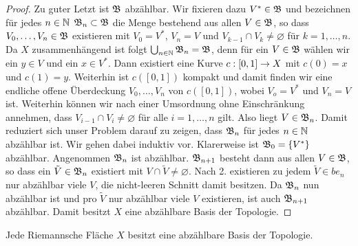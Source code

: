 \begin{proof}
  Zu guter Letzt ist $\mathfrak{B}$ abzählbar. 
  Wir fixieren dazu $V^\ast \in \mathfrak{B}$ und bezeichnen für jedes $n \in \mathbb{N}$
  $\mathfrak{B}_n \subset \mathfrak{B}$ die Menge bestehend aus allen $V \in \mathfrak{B}$, so
  dass $V_0, \dots, V_n \in \mathfrak{B}$ existieren mit $V_0 = V^\ast$, $V_n = V$ und $V_{k-1}
  \cap V_k \neq \varnothing$ für $k = 1, \dots, n$. 
  Da $X$ zusammenhängend ist folgt $\bigcup_{n \in \mathbb{N}} \mathfrak{B}_n =
  \mathfrak{B}$, denn für ein $V \in \mathfrak{B}$ wählen wir ein $y \in V$ und ein $x
  \in V^\ast$. Dann existiert eine Kurve $c: [0,1] \rightarrow X$ mit $c(0)
  = x$ und $c(1) = y$. Weiterhin ist $c([0,1])$ kompakt und damit
  finden wir eine endliche offene Überdeckung $V_0, \dots, V_n$ von
  $c([0,1])$, wobei $V_o = V^\ast$ und $V_n = V$ ist. Weiterhin
  können wir nach einer Umsordnung ohne Einschränkung annehmen,
  dass $V_{i-1} \cap V_{i} \neq \varnothing$ für alle $i= 1, \dots,
  n$ gilt. Also liegt $V \in \mathfrak{B}_n$.
  Damit reduziert sich unser Problem darauf zu zeigen, dass $\mathfrak{B}_n$
  für jedes $n \in \mathbb{N}$ abzählbar ist. Wir gehen dabei induktiv vor.
  Klarerweise ist $\mathfrak{B}_0 = \{V^\ast\}$ abzählbar. Angenommen $\mathfrak{B}_n$
  ist abzählbar. $\mathfrak{B}_{n+1}$ besteht dann aus allen $V \in \mathfrak{B}$, so
  dass ein $\tilde V \in \mathfrak{B}_n$ existiert mit $V \cap \tilde V \neq
  \varnothing$. Nach 2. existieren zu jedem $\tilde V \in be_n$ nur
  abzählbar viele $V$, die nicht-leeren Schnitt damit besitzen. 
  Da $\mathfrak{B}_n$ nun abzählbar ist und pro $\tilde V$ nur abzählbar
  viele $V$ existieren, ist auch $\mathfrak{B}_{n+1}$ abzählbar.
  Damit besitzt $X$ eine abzählbare Basis der Topologie.
\end{proof}

\begin{thm}[Rad\'o]
  Jede Riemannsche Fläche $X$ besitzt eine abzählbare Basis der
  Topologie.
  \label{thm:rado}
\end{thm}


